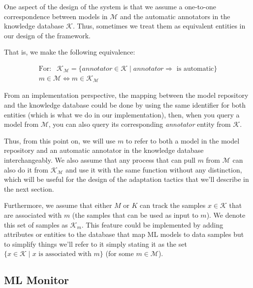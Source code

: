 \documentclass[../main.tex]{subfiles}
\begin{document}
    One aspect of the design of the system is that we assume a one-to-one correspondence between models in $\mathcal{M}$ and the automatic annotators in the knowledge database $\mathcal{K}$. Thus, sometimes we treat them as equivalent entities in our design of the framework.
    
    That is, we make the following equivalence:
    
    \vspace{-0.5cm}

    \[
        \begin{gathered}
        \text{For: }\ \  \mathcal{K}_{\mathcal{M}} =  \{\textit{annotator} \in \mathcal{K} \mid \textit{annotator} \Rightarrow \text{ is automatic}\} \\ 
        m \in \mathcal{M} \iff m \in \mathcal{K}_{\mathcal{M}}
        \end{gathered}
    \]
    
    From an implementation perspective, the mapping between the model repository and the knowledge database could be done by using the same identifier for both entities (which is what we do in our implementation), then, when you query a model from $\mathcal{M}$, you can also query its corresponding \textit{annotator} entity from $\mathcal{K}$.
    
    Thus, from this point on, we will use $m$ to refer to both a model in the model repository and an automatic annotator in the knowledge database interchangeably. We also assume that any process that can pull $m$ from $\mathcal{M}$ can also do it from $\mathcal{K}_\mathcal{M}$ and use it with the same function without any distinction, which will be useful for the design of the adaptation tactics that we'll describe in the next section.

    Furthermore, we assume that either $M$ or $K$ can track the samples $x \in \mathcal{K}$ that are associated with $m$ (the samples that can be used as input to $m$). We denote this set of samples as $\mathcal{K}_m$. This feature could be implemented by adding attributes or entities to the database that map ML models to data samples but to simplify things we'll refer to it simply stating it as the set $\{x \in \mathcal{K} \mid x \text{ is associated with } m\}$ (for some $m \in \mathcal{M}$).

    \vspace{-0.3cm}
    \subsection{ML Monitor} \label{sec:ml_monitor}
\end{document}
